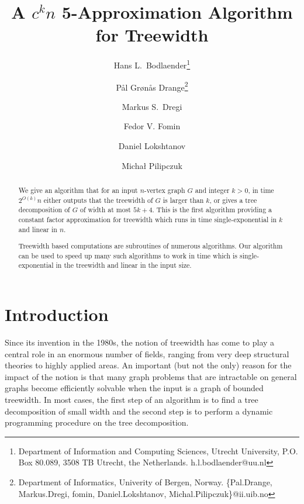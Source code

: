 \documentclass[a4paper,11pt]{article}
\theoremstyle{definition}
\theoremstyle{remark}
\begin{document}
\title{A $c^k n$ 5-Approximation Algorithm for Treewidth}
\author{
  Hans L.\ Bodlaender\thanks{Department of Information and
    Computing Sciences, Utrecht University, P.O. Box 80.089, 3508 TB
    Utrecht, the Netherlands.  {h.l.bodlaender@uu.nl}}
  \and 
  Pål Grønås Drange\thanks{Department of Informatics, Univerity of
    Bergen, Norway.  \{Pal.Drange, Markus.Dregi, fomin,
      Daniel.Lokshtanov, Michal.Pilipczuk\}@ii.uib.no}
  \and
  Markus S.\ Dregi\footnotemark[2]
  \and
  Fedor V. Fomin\footnotemark[2]
  \and
  Daniel Lokshtanov\footnotemark[2]
  \and
  Micha\l{} Pilipczuk\footnotemark[2]}

\maketitle

\begin{abstract}
  We give an algorithm that for an input $n$-vertex graph $G$ and
  integer $k>0$, in time $2^{O(k)} n$ either outputs that the
  treewidth of $G$ is larger than $k$, or gives a tree decomposition
  of $G$ of width at most $5k+4$.  This is the first algorithm
  providing a constant factor approximation for treewidth which runs
  in time single-exponential in $k$ and linear in $n$.
  
  Treewidth based computations are subroutines of numerous algorithms.
  Our algorithm can be used to speed up many such algorithms to work
  in time which is single-exponential in the treewidth and linear in
  the input size.
\end{abstract}

\section{Introduction}
\label{section:introduction}
Since its invention in the 1980s, the notion of treewidth has come to
play a central role in an enormous number of fields, ranging from very
deep structural theories to highly applied areas.  An important (but
not the only) reason for the impact of the notion is that many graph
problems that are intractable on general graphs become efficiently
solvable when the input is a graph of bounded treewidth.  In most
cases, the first step of an algorithm is to find a tree decomposition
of small width and the second step is to perform a dynamic programming
procedure on the tree decomposition.
\end{document}
